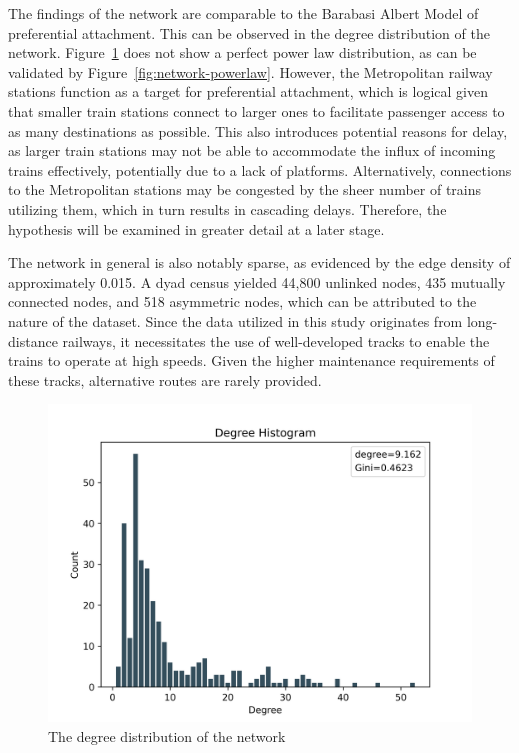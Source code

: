 \documentclass[12pt,a4paper]{article}
\newcounter{para}
\begin{document}
The findings of the network are comparable to the Barabasi Albert Model of preferential attachment. This can be observed in the degree distribution of the network. 
Figure~\ref{fig:network-deg-dist} does not show a perfect power law distribution, as can be validated by Figure~\ref{fig:network-powerlaw}. 
However, the Metropolitan railway stations function as a target for preferential attachment, which is logical given that smaller train stations connect to larger ones to facilitate passenger access to as many destinations as possible. 
This also introduces potential reasons for delay, as larger train stations may not be able to accommodate the influx of incoming trains effectively, potentially due to a lack of platforms. Alternatively, connections to the Metropolitan stations may be congested by the sheer number of trains utilizing them, which in turn results in cascading delays. 
Therefore, the hypothesis will be examined in greater detail at a later stage. 

The network in general is also notably sparse, as evidenced by the edge density of approximately 0.015. 
A dyad census yielded 44,800 unlinked nodes, 435 mutually connected nodes, and 518 asymmetric nodes, which can be attributed to the nature of the dataset. Since the data utilized in this study originates from long-distance railways, it necessitates the use of well-developed tracks to enable the trains to operate at high speeds. Given the higher maintenance requirements of these tracks, alternative routes are rarely provided.

\begin{figure}[!h]
  \includegraphics[clip=true,width=\columnwidth]{../data/visualizations/degree_dist.png}
  \caption{The degree distribution of the network}
   \label{fig:network-deg-dist}
\end{figure}
\end{document}
